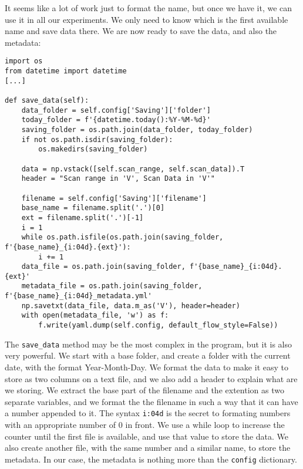 It seems like a lot of work just to format the name, but once we have it, we can use it in all our experiments. We only need to know which is the first available name and save data there. We are now ready to save the data, and also the metadata:

\begin{verbatim}
import os
from datetime import datetime
[...]

def save_data(self):
	data_folder = self.config['Saving']['folder']
	today_folder = f'{datetime.today():%Y-%M-%d}'
	saving_folder = os.path.join(data_folder, today_folder)
	if not os.path.isdir(saving_folder):
	    os.makedirs(saving_folder)

	data = np.vstack([self.scan_range, self.scan_data]).T
    header = "Scan range in 'V', Scan Data in 'V'"

    filename = self.config['Saving']['filename']
    base_name = filename.split('.')[0]
    ext = filename.split('.')[-1]
    i = 1
    while os.path.isfile(os.path.join(saving_folder, f'{base_name}_{i:04d}.{ext}'):
        i += 1
    data_file = os.path.join(saving_folder, f'{base_name}_{i:04d}.{ext}'
    metadata_file = os.path.join(saving_folder, f'{base_name}_{i:04d}_metadata.yml'
    np.savetxt(data_file, data.m_as('V'), header=header)
    with open(metadata_file, 'w') as f:
        f.write(yaml.dump(self.config, default_flow_style=False))
\end{verbatim}

The \texttt{save\_data} method may be the most complex in the program, but it is also very powerful. We start with a base folder, and create a folder with the current date, with the format Year-Month-Day. We format the data to make it easy to store as two columns on a text file, and we also add a header to explain what are we storing. We extract the base part of the filename and the extention as two separate variables, and we format the the filename in such a way that it can have a number appended to it. The syntax \texttt{i:04d} is the secret to formating numbers with an appropriate number of $0$ in front. We use a while loop to increase the counter until the first file is available, and use that value to store the data. We also create another file, with the same number and a similar name, to store the metadata. In our case, the metadata is nothing more than the \texttt{config} dictionary.


